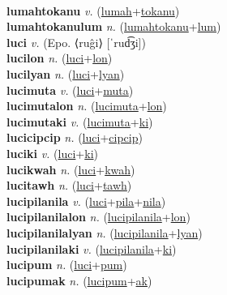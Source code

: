  \label{lumahfuntalon} \\
\textbf{lumahtokanu} \textit{v.} (\hyperref[lumah]{lumah}+\hyperref[tokanu]{tokanu})
 \label{lumahtokanu} \\
\textbf{lumahtokanulum} \textit{n.} (\hyperref[lumahtokanu]{lumahtokanu}+\hyperref[lum]{lum})
 \label{lumahtokanulum} \\
\textbf{luci} \textit{v.} (Epo. ⟨ruĝi⟩ [ˈrud͡ʒi])
 \label{luci} \\
\textbf{lucilon} \textit{n.} (\hyperref[luci]{luci}+\hyperref[lon]{lon})
 \label{lucilon} \\
\textbf{lucilyan} \textit{n.} (\hyperref[luci]{luci}+\hyperref[lyan]{lyan})
 \label{lucilyan} \\
\textbf{lucimuta} \textit{v.} (\hyperref[luci]{luci}+\hyperref[muta]{muta})
 \label{lucimuta} \\
\textbf{lucimutalon} \textit{n.} (\hyperref[lucimuta]{lucimuta}+\hyperref[lon]{lon})
 \label{lucimutalon} \\
\textbf{lucimutaki} \textit{v.} (\hyperref[lucimuta]{lucimuta}+\hyperref[ki]{ki})
 \label{lucimutaki} \\
\textbf{lucicipcip} \textit{n.} (\hyperref[luci]{luci}+\hyperref[cipcip]{cipcip})
 \label{lucicipcip} \\
\textbf{luciki} \textit{v.} (\hyperref[luci]{luci}+\hyperref[ki]{ki})
 \label{luciki} \\
\textbf{lucikwah} \textit{n.} (\hyperref[luci]{luci}+\hyperref[kwah]{kwah})
 \label{lucikwah} \\
\textbf{lucitawh} \textit{n.} (\hyperref[luci]{luci}+\hyperref[tawh]{tawh})
 \label{lucitawh} \\
\textbf{lucipilanila} \textit{v.} (\hyperref[luci]{luci}+\hyperref[pila]{pila}+\hyperref[nila]{nila})
 \label{lucipilanila} \\
\textbf{lucipilanilalon} \textit{n.} (\hyperref[lucipilanila]{lucipilanila}+\hyperref[lon]{lon})
 \label{lucipilanilalon} \\
\textbf{lucipilanilalyan} \textit{n.} (\hyperref[lucipilanila]{lucipilanila}+\hyperref[lyan]{lyan})
 \label{lucipilanilalyan} \\
\textbf{lucipilanilaki} \textit{v.} (\hyperref[lucipilanila]{lucipilanila}+\hyperref[ki]{ki})
 \label{lucipilanilaki} \\
\textbf{lucipum} \textit{n.} (\hyperref[luci]{luci}+\hyperref[pum]{pum})
 \label{lucipum} \\
\textbf{lucipumak} \textit{n.} (\hyperref[lucipum]{lucipum}+\hyperref[ak]{ak})

